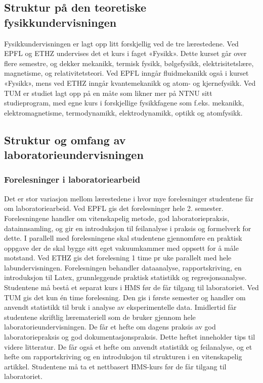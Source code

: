 \documentclass{article}
\begin{document}
\subsection{Struktur på den teoretiske fysikkundervisningen}
Fysikkundervisningen er lagt opp litt forskjellig ved de tre lærestedene. Ved EPFL og ETHZ undervises det et kurs i faget «Fysikk». Dette kurset går over flere semestre, og dekker mekanikk, termisk fysikk, bølgefysikk, elektrisitetslære, magnetisme, og relativitetsteori. Ved EPFL inngår fluidmekanikk også i kurset «Fysikk», mens ved ETHZ inngår kvantemekanikk og atom- og kjernefysikk. Ved TUM er studiet lagt opp på en måte som likner mer på NTNU sitt studieprogram, med egne kurs i forskjellige fysikkfagene som f.eks. mekanikk, elektromagnetisme, termodynamikk, elektrodynamikk, optikk og atomfysikk. 

\subsection{Struktur og omfang av laboratorieundervisningen}

\subsubsection{Forelesninger i laboratoriearbeid}\label{forel_lab}
Det er stor variasjon mellom lærestedene i hvor mye forelesninger studentene får om laboratoriearbeid. 
Ved EPFL gis det forelesninger hele 2. semester. Forelesningene handler om vitenskapelig metode, god laboratoriepraksis, datainnsamling, og gir en introduksjon til feilanalyse i praksis og formelverk for dette. I parallell med forelesningene skal studentene gjennomføre en praktisk oppgave der de skal bygge sitt eget vakuumkammer med oppsett for å måle motstand. 
Ved ETHZ gis det forelesning 1 time pr uke parallelt med hele labundervisningen. Forelesningen behandler dataanalyse, rapportskriving, en introduksjon til Latex, grunnleggende praktisk statistikk og regresjonsanalyse. Studentene må bestå et separat kurs i HMS før de får tilgang til laboratoriet. 
Ved TUM gis det kun én time forelesning. Den gis i første semester og handler om anvendt statistikk til bruk i analyse av eksperimentelle data. Imidlertid får studentene skriftlig læremateriell som de bruker gjennom hele laboratorieundervisningen. De får et hefte om dagens praksis av god laboratoriepraksis og god dokumentasjonspraksis. Dette heftet inneholder tips til videre litteratur. De får også et hefte om anvendt statistikk og feilanalyse, og et hefte om rapportskriving og en introduksjon til strukturen i en vitenskapelig artikkel. Studentene må ta et nettbasert HMS-kurs før de får tilgang til laboratoriet. 
\end{document}

